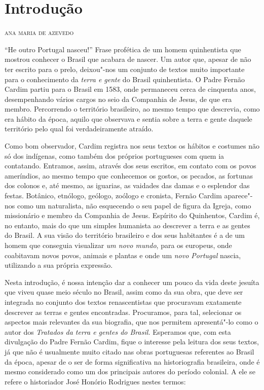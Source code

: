 \chapter[Introdução, \emph{por Ana Maria de Azevedo}]{Introdução}

\begin{flushright}
\textsc{ana maria de azevedo}
\end{flushright}

``He outro Portugal nasceu!'' Frase profética de um homem quinhentista que mostrou conhecer o
Brasil que acabara de nascer. Um autor que, apesar de não ter escrito
para o prelo, deixou"-nos um conjunto de textos muito importante para o
conhecimento da \textit{terra e gente} do Brasil quinhentista. O Padre
Fernão Cardim partiu para o Brasil em 1583, onde permaneceu cerca de
cinquenta anos, desempenhando vários cargos no seio da Companhia de
Jesus, de que era membro. Percorrendo o território brasileiro, ao mesmo
tempo que descrevia, como era hábito da época, aquilo que observava e
sentia sobre a terra e gente daquele território pelo qual foi
verdadeiramente atraído. 

Como bom observador, Cardim registra nos seus textos os hábitos e
costumes não só dos indígenas, como também dos próprios portugueses
com quem ia contatando. Entramos, assim, através dos seus escritos, em
contato com os povos ameríndios, ao mesmo tempo que conhecemos os
gostos, os pecados, as fortunas dos colonos e, até mesmo, as iguarias,
as vaidades das damas e o esplendor das festas. Botânico, etnólogo,
geólogo, zoólogo e cronista, Fernão Cardim aparece"-nos como um
naturalista, não esquecendo o seu papel de figura da Igreja, como
missionário e membro da Companhia de Jesus. Espírito do Quinhentos,
Cardim é, no entanto, mais do que um simples humanista ao descrever a
terra e as gentes do Brasil. A sua visão do território brasileiro e dos
seus habitantes é a de um homem que conseguia visualizar \textit{um
novo mundo}, para os europeus, onde coabitavam novos povos,
animais e plantas e onde um \textit{novo Portugal} nascia, utilizando a
sua própria expressão.

Nesta introdução, é nossa intenção dar a conhecer um pouco da vida
deste jesuíta que viveu quase meio século no Brasil, assim como da sua
obra, que deve ser integrada no conjunto dos textos renascentistas que
procuravam exatamente descrever as terras e gentes encontradas.
Procuramos, para tal, selecionar os aspectos mais relevantes da sua
biografia, que nos permitem apresentá"-lo como o autor dos
\textit{Tratados da terra e gentes do Brasil.} Esperamos que, com esta
divulgação do Padre Fernão Cardim, fique o interesse pela leitura dos
seus textos, já que não é usualmente muito citado nas obras portuguesas
referentes ao Brasil da época, apesar de o ser de forma significativa
na historiografia brasileira, onde é mesmo considerado como um dos
principais autores do período colonial. A ele se refere o historiador
José Honório Rodrigues nestes termos:

